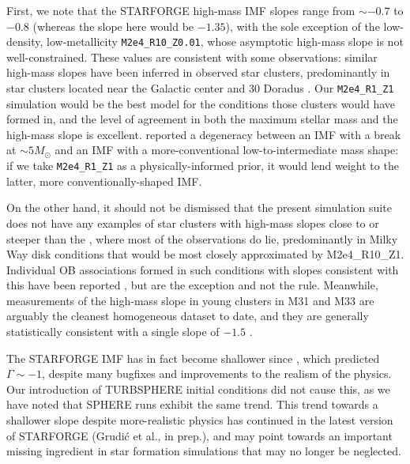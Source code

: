 \documentclass[apjl,twocolumn]{openjournal}
\begin{document}
First, we note that the \small{STARFORGE} high-mass IMF slopes range from $\sim -0.7$ to $-0.8$ (whereas the \citet{salpeter_slope} slope here would be $-1.35$), with the sole exception of the low-density, low-metallicity \texttt{M2e4\_R10\_Z0.01}, whose asymptotic high-mass slope is not well-constrained. These values are consistent with some observations: similar high-mass slopes have been inferred in observed star clusters, predominantly in star clusters located near the Galactic center \citep{brandner:2008.westerlund.imf,hussmann:2012.quintuplet.imf, hosek:2019.arches.imf} and 30 Doradus \citep{schneider:2018.30dor.imf.excess}. Our \texttt{M2e4\_R1\_Z1} simulation would be the best model for the conditions those clusters would have formed in, and the level of agreement in both the maximum stellar mass and the high-mass slope is excellent. \citet{hosek:2019.arches.imf} reported a degeneracy between an IMF with a break at $\sim 5M_\odot$ and an IMF with a more-conventional low-to-intermediate mass shape: if we take \texttt{M2e4\_R1\_Z1} as a physically-informed prior, it would lend weight to the latter, more conventionally-shaped IMF.

On the other hand, it should not be dismissed that the present simulation suite does not have any examples of star clusters with high-mass slopes close to or steeper than the \citet{salpeter_slope}, where most of the observations do lie, predominantly in Milky Way disk conditions that would be most closely approximated by \small{M2e4\_R10\_Z1}. Individual OB associations formed in such conditions with slopes consistent with this have been reported \citep{massey:1995.mw.ob.assoc.imf}, but are the exception and not the rule. Meanwhile, measurements of the high-mass slope in young clusters in M31 and M33 are arguably the cleanest homogeneous dataset to date, and they are generally statistically consistent with a single slope of $-1.5$ \citep{weisz:2015.m31.imf, wainer:2024.m33.imf}.

The \small{STARFORGE} IMF has in fact become shallower since \citet{starforge.fullphysics}, which predicted $\Gamma \sim -1$, despite many bugfixes and improvements to the realism of the physics. Our introduction of \small{TURBSPHERE} initial conditions did not cause this, as we have noted that \small{SPHERE} runs exhibit the same trend. This trend towards a shallower slope despite more-realistic physics has continued in the latest version of \small{STARFORGE} (Grudi\'{c} et al., in prep.), and may point towards an important missing ingredient in star formation simulations that may no longer be neglected.
\end{document}
